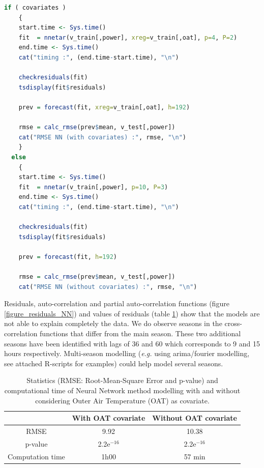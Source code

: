 \begin{lstlisting}[language=R, caption={R code for Neural Network method modelling and forecasting}, captionpos=b, label={lst_NN}]
  if ( covariates )
    {
    start.time <- Sys.time()
    fit  = nnetar(v_train[,power], xreg=v_train[,oat], p=4, P=2)
    end.time <- Sys.time()
    cat("timing :", (end.time-start.time), "\n")

    checkresiduals(fit)
    tsdisplay(fit$residuals)

    prev = forecast(fit, xreg=v_train[,oat], h=192)

    rmse = calc_rmse(prev$mean, v_test[,power])
    cat("RMSE NN (with covariates) :", rmse, "\n")
    }
  else
    {
    start.time <- Sys.time()
    fit  = nnetar(v_train[,power], p=10, P=3)
    end.time <- Sys.time()
    cat("timing :", (end.time-start.time), "\n")

    checkresiduals(fit)
    tsdisplay(fit$residuals)

    prev = forecast(fit, h=192)

    rmse = calc_rmse(prev$mean, v_test[,power])
    cat("RMSE NN (without covariates) :", rmse, "\n")
\end{lstlisting}

Residuals, auto-correlation and partial auto-correlation functions (figure 
\ref{figure_residuals_NN}) and values of residuals (table \ref{table_NN}) show that the models are 
not able to explain completely the data. We do observe seasons in the cross-correlation functions 
that differ from the main season. These two additional seasons have been identified with lags of 36 
and 60 which corresponds to 9 and 15 hours respectively. Multi-season modelling (\textit{e.g.} 
using arima/fourier modelling, see attached R-scripts for examples) could help model several 
seasons. 

\begin{table}[H]
\centering \begin{tabular}{c|cc}
                 & With OAT covariate & Without OAT covariate\\\hline\hline
RMSE             &   9.92    & 10.38 \\
p-value          & 2.2e$^{-16}$ &  2.2e$^{-16}$ \\
Computation time &  1h00     &  57 min \\
\end{tabular}
\caption{Statistics (RMSE: Root-Mean-Square Error and p-value) and computational time of Neural Network method modelling with and without considering Outer Air Temperature (OAT) as covariate.}
\label{table_NN}
\end{table}



